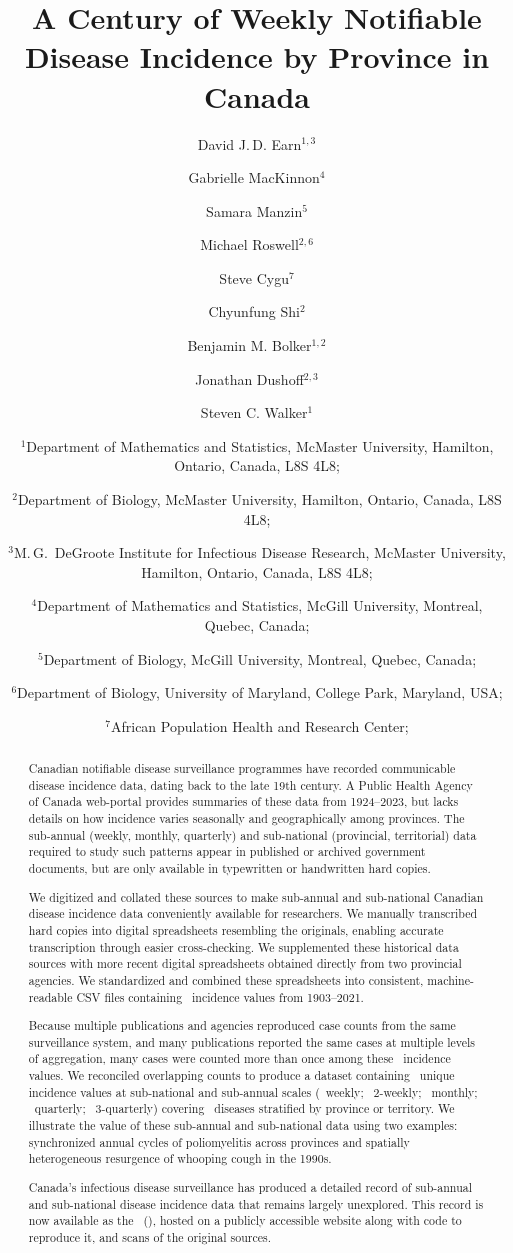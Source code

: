 \documentclass[12pt]{article}
\title{A Century of Weekly Notifiable Disease Incidence by Province in Canada}
\author{
     David J.\,D. Earn$^{1,3}$
\and Gabrielle MacKinnon$^4$
\and Samara Manzin$^5$
\and Michael Roswell$^{2,6}$ %
\and Steve Cygu$^7$ %
\and Chyunfung Shi$^2$ %
\and Benjamin M. Bolker$^{1,2}$ %
\and Jonathan Dushoff$^{2,3}$ %
\and Steven C. Walker$^1$
\and \footnotesize$^1$Department of Mathematics and Statistics,
     McMaster University, Hamilton, Ontario, Canada, L8S 4L8;
\and \footnotesize$^2$Department of Biology,
     McMaster University, Hamilton, Ontario, Canada, L8S 4L8;
\and \footnotesize$^3$M.\,G.\ DeGroote Institute for Infectious Disease Research,
  McMaster University, Hamilton, Ontario, Canada, L8S 4L8;
\and \footnotesize$^4$Department of Mathematics and Statistics,
  McGill University, Montreal, Quebec, Canada;
\and \footnotesize$^5$Department of Biology,
  McGill University, Montreal, Quebec, Canada;
\and \footnotesize$^6$Department of Biology,
  University of Maryland, College Park, Maryland, USA;
\and \footnotesize$^7$African Population Health and Research Center;
  \\
}
\begin{document}
\maketitle


\newpage

\begin{abstract}

Canadian notifiable disease surveillance programmes have recorded communicable disease incidence data, dating back to the late 19th century. A Public Health Agency of Canada web-portal provides summaries of these data from 1924--2023, but lacks details on how incidence varies seasonally and geographically among provinces. The sub-annual (weekly, monthly, quarterly) and sub-national (provincial, territorial) data required to study such patterns appear in published or archived government documents, but are only available in typewritten or handwritten hard copies.

We digitized and collated these sources to make sub-annual and sub-national Canadian disease incidence data conveniently available for researchers. We manually transcribed hard copies into digital spreadsheets resembling the originals, enabling accurate transcription through easier cross-checking. We supplemented these historical data sources with more recent digital spreadsheets obtained directly from two provincial agencies. We standardized and combined these spreadsheets into consistent, machine-readable CSV files containing \ incidence values from 1903--2021.

Because multiple publications and agencies reproduced case counts from the same surveillance system, and many publications reported the same cases at multiple levels of aggregation, many cases were counted more than once among these \ incidence values. We reconciled overlapping counts to produce a dataset containing \ unique incidence values at sub-national and sub-annual scales (\ weekly; \ 2-weekly; \ monthly; \ quarterly; \ 3-quarterly) covering \ diseases stratified by province or territory. We illustrate the value of these sub-annual and sub-national data using two examples: synchronized annual cycles of poliomyelitis across provinces and spatially heterogeneous resurgence of whooping cough in the 1990s.

Canada's infectious disease surveillance has produced a detailed record of sub-annual and sub-national disease incidence data that remains largely unexplored. This record is now available as the \datname\ (\datacronym), hosted on a publicly accessible website along with code to reproduce it, and scans of the original sources.

\end{abstract}
\end{document}
